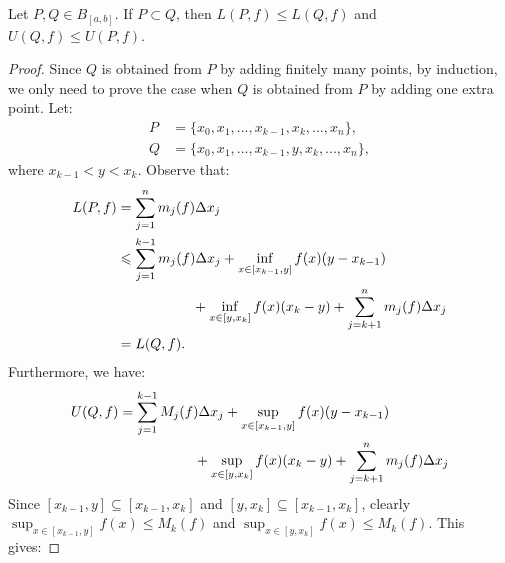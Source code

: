 \documentclass[10pt,twoside,openany]{memoir}
\begin{document}
    \begin{proposition}\label{prop:2}
        Let $P,Q \in B_{[a,b]}$. If $P \subset Q$, then $L(P,f) \leq L(Q,f)$ and $U(Q,f) \leq U(P,f)$.
    \end{proposition}
        \begin{proof}
            Since $Q$ is obtained from $P$ by adding finitely many points, by induction, we only need to prove the case when $Q$ is obtained from $P$ by adding one extra point. Let:
                \begin{equation*}
                \begin{split}
                    P &= \{x_0,x_1,...,x_{k-1},x_k,...,x_n\}, \\
                    Q &= \{x_0,x_1,...,x_{k-1},y,x_k,...,x_n\},
                \end{split}
                \end{equation*}
            where $x_{k-1} < y < x_k$. Observe that:
                \begin{equation*}
                \begin{split}
                    L(P,f) 
                    & = \sum_{j = 1}^n m_j(f)\Delta x_j \\
                    & \leq \sum_{j = 1}^{k-1} m_j(f)\Delta x_j 
                            + \inf_{x \in [x_{k-1},y]} f(x)(y - x_{k-1}) \\
                    & \h9\h9\h9\h9\h9\h9 + \inf_{x \in [y,x_{k}]} f(x)(x_{k} - y) 
                            + \sum_{j = k+1}^n m_j(f)\Delta x_j \\
                    & = L(Q,f).
                \end{split}
                \end{equation*}
            Furthermore, we have:
                \begin{equation*}
                \begin{split}
                    U(Q,f) 
                    & = \sum_{j = 1}^{k-1} M_j(f)\Delta x_j 
                            + \sup_{x \in [x_{k-1},y]} f(x)(y - x_{k-1}) \\
                    & \h9\h9\h9\h9\h9\h9 + \sup_{x \in [y,x_{k}]} f(x)(x_{k} - y) 
                            + \sum_{j = k+1}^n m_j(f)\Delta x_j \\
                \end{split}
                \end{equation*}
            Since $[x_{k-1},y] \subseteq [x_{k-1},x_k]$ and $[y,x_{k}] \subseteq [x_{k-1},x_k]$, clearly $\sup_{x \in [x_{k-1},y]} f(x) \leq M_k(f)$ and $\sup_{x \in [y,x_{k}]} f(x) \leq M_k(f)$. This gives:

\end{proof}
\end{document}
